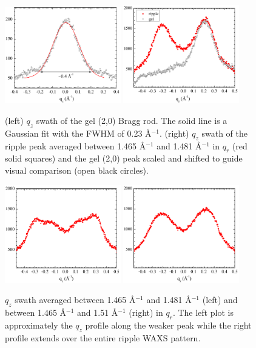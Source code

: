 \begin{figure}[htbp]
  \centering
  \includegraphics[width=0.45\textwidth]{figures/ripple/TWAXS/twaxs_gel_qz}
  \includegraphics[width=0.45\textwidth]{figures/ripple/TWAXS/twaxs_strong_qz}
  \caption[]{(left) $q_z$ swath of the gel (2,0) Bragg rod. The solid line is
  a Gaussian fit with the FWHM of 0.23 \AA$^{-1}$. 
  (right) $q_z$ swath of the ripple peak averaged between 1.465 \AA$^{-1}$ and 1.481 \AA$^{-1}$
   in $q_r$ (red solid squares) and the gel (2,0) peak scaled and shifted to guide 
   visual comparison (open black circles).}
  \label{fig:twaxs_gel_qz}
\end{figure}

\begin{figure}[htbp]
  \centering
  \includegraphics[width=0.45\textwidth]{figures/ripple/TWAXS/twaxs_weak_qz}
  \includegraphics[width=0.45\textwidth]{figures/ripple/TWAXS/twaxs_both_qz}
  \caption{$q_z$ swath averaged between 1.465 \AA$^{-1}$ and 1.481 \AA$^{-1}$
  (left) and between 1.465 \AA$^{-1}$ and 1.51 \AA$^{-1}$ (right) in $q_r$.
  The left plot is approximately the $q_z$ profile along the weaker peak
  while the right profile extends over the entire ripple WAXS pattern.}
  \label{fig:twaxs_qzplot}
\end{figure}  

